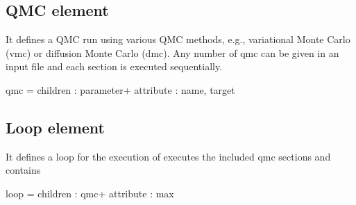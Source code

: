 \subsection{Q\-M\-C element}\label{a00004_qmcX}
It defines a Q\-M\-C run using various Q\-M\-C methods, e.\-g., variational Monte Carlo (vmc) or diffusion Monte Carlo (dmc). Any number of {\ttfamily qmc} can be given in an input file and each section is executed sequentially. 
\begin{DoxyCode}
qmc = 
  children  : parameter+ 
  attribute : name, target
\end{DoxyCode}
\subsection{Loop element}\label{a00004_loopX}
It defines a loop for the execution of executes the included {\ttfamily qmc} sections and contains 
\begin{DoxyCode}
loop = 
  children : qmc+
  attribute : max
\end{DoxyCode}
 
